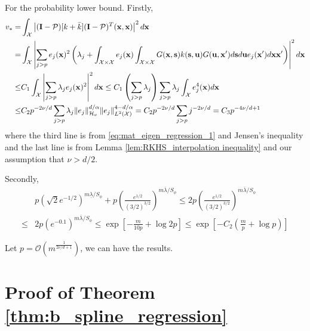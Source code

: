 \documentclass[aos,preprint]{imsart}
\theoremstyle{plain}
\newcommand{\CalO}{\mathcal O}
\newcommand{\CalH}{\mathcal H}
\newcommand{\CalX}{\mathcal X}
\newcommand{\CalP}{\mathcal P}
\newcommand{\BI}{\bold I}
\newcommand{\Bx}{\bold x}
\newcommand{\Bs}{\bold s}
\newcommand{\BFx}{\bold x}
\newcommand{\Bu}{\bold u}
\theoremstyle{remark}
\begin{document}
\begin{appendix}
For the probability lower bound. Firstly,
\begin{align*}
    v
    _*=&\int_\CalX \left| (\BI-\CalP)[k+\bar{k}](\BI-\CalP)^T(\Bx,\Bx)\right|^2d\Bx\\
    =&\int_\CalX\left|\sum_{j>p}e_j(\Bx)^2\left(\lambda_j+\int_{\CalX\times\CalX} e_j(\BFx)\int_{\CalX\times\CalX}G(\BFx,\Bs)k(\Bs,\Bu)G(\Bu,\Bx')d\Bs d\Bu e_j(\BFx')d\BFx\BFx' \right)\right|^2d\Bx\\
    \leq & C_1 \int_\CalX \left|\sum_{j>p}\lambda_j e_j(\Bx)^2\right|^2d\Bx \leq  C_1\left(\sum_{j>p}\lambda_j\right)\sum_{j>p}\lambda_j\int_\CalX e_j^4(\BFx)d\BFx\\
    \leq & C_2 p^{-2\nu/d}\sum_{j>p}\lambda_j\|e_j\|^{d/\alpha}_{\CalH_\nu}\|e_j\|_{L^2(\CalX)}^{4-d/\alpha}
    = C_2p^{-2\nu/d}\sum_{j>p}j^{-2\nu/d}=C_3 p^{-4\nu/d+1}
\end{align*}
where the third line is from \eqref{eq:mat_eigen_regression_1} and Jensen's inequality and the last line is from Lemma \ref{lem:RKHS_interpolation inequality} and our assumption that $\nu>d/2$.

Secondly,
\begin{align*}
    &p(\sqrt{2}e^{-1/2})^{m\underline{\lambda}/S_\phi} +p\left(\frac{e^{1/2}}{(3/2)^{3/2}}\right)^{m\overline{\lambda}/S_\phi}\leq 2p\left(\frac{e^{1/2}}{(3/2)^{3/2}}\right)^{m\overline{\lambda}/S_\phi}\\
    \leq & 2p \left(e^{-0.1}\right)^{m\overline{\lambda}/S_\phi}\leq \exp\left[-\frac{m}{10p}+\log 2p\right]\leq \exp\left[-C_2(\frac{m}{p}+\log p)\right]
\end{align*}


Let $p=\CalO(m^{\frac{1}{2\nu/d+1}})$, we can have the results.

\endproof

\fi



\section{Proof of Theorem \ref{thm:b_spline_regression}}
\label{pf:b_spline_regression}


\end{appendix}
\end{document}
